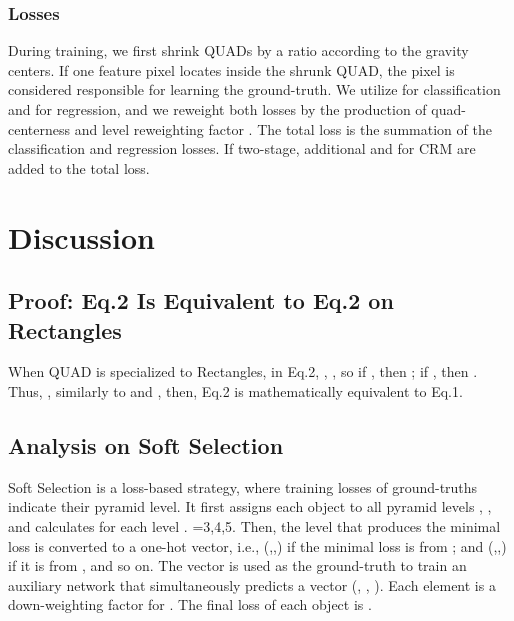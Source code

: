 \documentclass[runningheads]{llncs}
\begin{document}
\subsubsection{Losses}
During training, we first shrink QUADs by a ratio   according to the gravity centers. If one feature pixel locates inside the shrunk QUAD, the pixel is considered responsible for learning the ground-truth. 
We utilize  \cite{lin2017focal} for classification and  for regression, and we reweight both losses by the production of quad-centerness and level reweighting factor . The total loss is the summation of the classification and regression losses. If two-stage, additional  and  for CRM are added to the total loss.


\section{Discussion}
\subsection{Proof: Eq.2 Is Equivalent to Eq.2 on Rectangles}
When QUAD is specialized to Rectangles, in Eq.2,  , , so if , then ; if , then . Thus, , similarly to  and ,  then, Eq.2 is mathematically equivalent to Eq.1.

\subsection{Analysis on Soft Selection}
Soft Selection is a loss-based strategy, where training losses of ground-truths indicate their pyramid level. It first assigns each object to all pyramid levels , ,  and calculates  for each level . =3,4,5. Then, the level that produces the minimal loss is converted to a one-hot vector, i.e., (,,) if the minimal loss is from ; and (,,) if it is from , and so on. The vector is used as the ground-truth to train an auxiliary network that simultaneously predicts a vector (, , ). Each element  is a down-weighting factor for . The final loss of each object is . 
\end{document}
